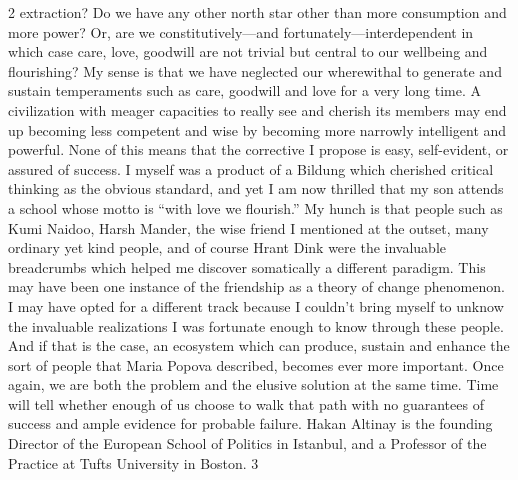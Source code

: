 2
extraction? Do we have any other north star other than more consumption and more power? Or, are we
constitutively—and fortunately—interdependent in which case care, love, goodwill are not trivial but central
to our wellbeing and flourishing? My sense is that we have neglected our wherewithal to generate and sustain
temperaments such as care, goodwill and love for a very long time. A civilization with meager capacities
to really see and cherish its members may end up becoming less competent and wise by becoming more
narrowly intelligent and powerful.
None of this means that the corrective I propose is easy, self-evident, or assured of success. I myself was
a product of a Bildung which cherished critical thinking as the obvious standard, and yet I am now thrilled
that my son attends a school whose motto is “with love we flourish.” My hunch is that people such as
Kumi Naidoo, Harsh Mander, the wise friend I mentioned at the outset, many ordinary yet kind people, and
of course Hrant Dink were the invaluable breadcrumbs which helped me discover somatically a different
paradigm. This may have been one instance of the friendship as a theory of change phenomenon. I may
have opted for a different track because I couldn’t bring myself to unknow the invaluable realizations I was
fortunate enough to know through these people. And if that is the case, an ecosystem which can produce,
sustain and enhance the sort of people that Maria Popova described, becomes ever more important.
Once again, we are both the problem and the elusive solution at the same time. Time will tell whether enough
of us choose to walk that path with no guarantees of success and ample evidence for probable failure.
Hakan Altinay is the founding Director of the European School of Politics in Istanbul, and a Professor of the
Practice at Tufts University in Boston.
3

